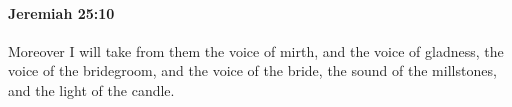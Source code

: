 
		\paragraph{Jeremiah 25:10} %
			\label{JEREMIAH-25-10}

			Moreover I will take from them the voice of mirth, and the voice of gladness, the voice of the bridegroom, and the voice of the bride, the sound of the millstones, and the light of the candle.



